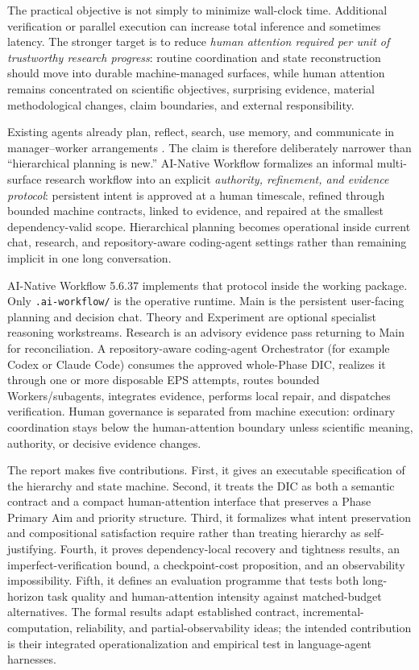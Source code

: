 \documentclass[11pt]{article}
\begin{document}
The practical objective is not simply to minimize wall-clock time. Additional verification or parallel execution can increase total inference and sometimes latency. The stronger target is to reduce \emph{human attention required per unit of trustworthy research progress}: routine coordination and state reconstruction should move into durable machine-managed surfaces, while human attention remains concentrated on scientific objectives, surprising evidence, material methodological changes, claim boundaries, and external responsibility.

Existing agents already plan, reflect, search, use memory, and communicate in manager--worker arrangements \citep{yao2023react,yao2023tot,besta2024got,shinn2023reflexion,wu2023autogen,hong2024metagpt}. The claim is therefore deliberately narrower than ``hierarchical planning is new.'' AI-Native Workflow formalizes an informal multi-surface research workflow into an explicit \emph{authority, refinement, and evidence protocol}: persistent intent is approved at a human timescale, refined through bounded machine contracts, linked to evidence, and repaired at the smallest dependency-valid scope. Hierarchical planning becomes operational inside current chat, research, and repository-aware coding-agent settings rather than remaining implicit in one long conversation.

AI-Native Workflow 5.6.37 implements that protocol inside the working package. Only \texttt{.ai-workflow/} is the operative runtime. Main is the persistent user-facing planning and decision chat. Theory and Experiment are optional specialist reasoning workstreams. Research is an advisory evidence pass returning to Main for reconciliation. A repository-aware coding-agent Orchestrator (for example Codex or Claude Code) consumes the approved whole-Phase DIC, realizes it through one or more disposable EPS attempts, routes bounded Workers/subagents, integrates evidence, performs local repair, and dispatches verification. Human governance is separated from machine execution: ordinary coordination stays below the human-attention boundary unless scientific meaning, authority, or decisive evidence changes.

The report makes five contributions. First, it gives an executable specification of the hierarchy and state machine. Second, it treats the DIC as both a semantic contract and a compact human-attention interface that preserves a Phase Primary Aim and priority structure. Third, it formalizes what intent preservation and compositional satisfaction require rather than treating hierarchy as self-justifying. Fourth, it proves dependency-local recovery and tightness results, an imperfect-verification bound, a checkpoint-cost proposition, and an observability impossibility. Fifth, it defines an evaluation programme that tests both long-horizon task quality and human-attention intensity against matched-budget alternatives. The formal results adapt established contract, incremental-computation, reliability, and partial-observability ideas; the intended contribution is their integrated operationalization and empirical test in language-agent harnesses.
\end{document}
